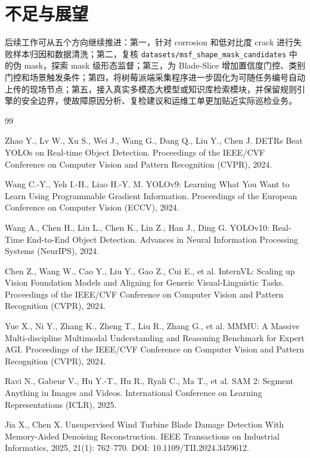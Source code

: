 \documentclass[UTF8,zihao=-4,a4paper]{ctexrep}
\newcommand{\code}[1]{\texttt{#1}}
\begin{document}
\section{不足与展望}
后续工作可从五个方向继续推进：第一，针对 corrosion 和低对比度 crack 进行失败样本归因和数据清洗；第二，复核 \code{datasets/msf\_shape\_mask\_candidates} 中的伪 mask，探索 mask 级形态监督；第三，为 Blade-Slice 增加置信度门控、类别门控和场景触发条件；第四，将树莓派端采集程序进一步固化为可随任务编号自动上传的现场节点；第五，接入真实多模态大模型或知识库检索模块，并保留规则引擎的安全边界，使故障原因分析、复检建议和运维工单更加贴近实际巡检业务。

\begin{thebibliography}{99}

Zhao Y., Lv W., Xu S., Wei J., Wang G., Dang Q., Liu Y., Chen J. DETRs Beat YOLOs on Real-time Object Detection. Proceedings of the IEEE/CVF Conference on Computer Vision and Pattern Recognition (CVPR), 2024.

Wang C.-Y., Yeh I.-H., Liao H.-Y. M. YOLOv9: Learning What You Want to Learn Using Programmable Gradient Information. Proceedings of the European Conference on Computer Vision (ECCV), 2024.

Wang A., Chen H., Liu L., Chen K., Lin Z., Han J., Ding G. YOLOv10: Real-Time End-to-End Object Detection. Advances in Neural Information Processing Systems (NeurIPS), 2024.

Chen Z., Wang W., Cao Y., Liu Y., Gao Z., Cui E., et al. InternVL: Scaling up Vision Foundation Models and Aligning for Generic Visual-Linguistic Tasks. Proceedings of the IEEE/CVF Conference on Computer Vision and Pattern Recognition (CVPR), 2024.

Yue X., Ni Y., Zhang K., Zheng T., Liu R., Zhang G., et al. MMMU: A Massive Multi-discipline Multimodal Understanding and Reasoning Benchmark for Expert AGI. Proceedings of the IEEE/CVF Conference on Computer Vision and Pattern Recognition (CVPR), 2024.

Ravi N., Gabeur V., Hu Y.-T., Hu R., Ryali C., Ma T., et al. SAM 2: Segment Anything in Images and Videos. International Conference on Learning Representations (ICLR), 2025.

Jia X., Chen X. Unsupervised Wind Turbine Blade Damage Detection With Memory-Aided Denoising Reconstruction. IEEE Transactions on Industrial Informatics, 2025, 21(1): 762--770. DOI: 10.1109/TII.2024.3459612.


\end{thebibliography}
\end{document}
